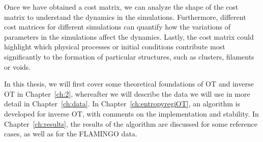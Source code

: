 Once we have obtained a cost matrix, we can analyze the shape of the cost matrix to understand the dynamics in the simulations. Furthermore, different cost matrices for different simulations can quantify how the variations of parameters in the simulations affect the dynamics. Lastly, the cost matrix could highlight which physical processes or initial conditions contribute most significantly to the formation of particular structures, such as clusters, filaments or voids. \par 
In this thesis, we will first cover some theoretical foundations of OT and inverse OT in Chapter~\ref{ch:2}, whereafter we will describe the data we will use in more detail in Chapter~\ref{ch:data}. In Chapter~\ref{ch:entropyregiOT}, an algorithm is developed for inverse OT, with comments on the implementation and stability. In Chapter~\ref{ch:results}, the results of the algorithm are discussed for some reference cases, as well as for the FLAMINGO data. 

